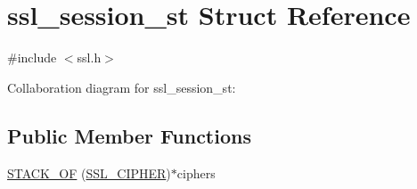 \hypertarget{structssl__session__st}{\section{ssl\-\_\-session\-\_\-st Struct Reference}
\label{structssl__session__st}
}


{\ttfamily \#include $<$ssl.\-h$>$}



Collaboration diagram for ssl\-\_\-session\-\_\-st\-:
\subsection*{Public Member Functions}
\begin{DoxyCompactItemize}
\item 
\hyperlink{structssl__session__st_a2f3bc734f54c269abc797fa55b4085a2}{S\-T\-A\-C\-K\-\_\-\-O\-F} (\hyperlink{ssl_8h_a548d7a5d565a9e0e9bd45c49f8c95701}{S\-S\-L\-\_\-\-C\-I\-P\-H\-E\-R})$\ast$ciphers
\end{DoxyCompactItemize}
